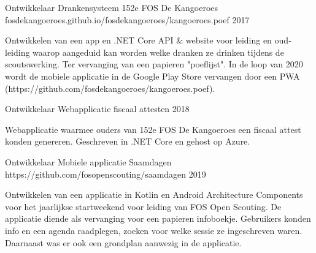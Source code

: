 


\begin{cventries}


\cventry
{Ontwikkelaar} %
{Drankensysteem 152e FOS De Kangoeroes} %
{fosdekangoeroes.github.io/fosdekangoeroes/kangoeroes.poef} %
{2017} %
{ 
\begin{cvitems}
\item {Ontwikkelen van een app en .NET Core API \& website voor leiding en oud-leiding waarop aangeduid kan worden welke dranken ze drinken tijdens de scoutswerking. Ter vervanging van een papieren "poeflijst". In de loop van 2020 wordt de mobiele applicatie in de Google Play Store vervangen door een PWA (https://github.com/fosdekangoeroes/kangoeroes.poef).}
\end{cvitems}
}

\cventry
{Ontwikkelaar} %
{Webapplicatie fiscaal attesten} %
{}
{2018} %
{ 
\begin{cvitems}
\item {Webapplicatie waarmee ouders van 152e FOS De Kangoeroes een fiscaal attest konden genereren. Geschreven in .NET Core en gehost op Azure.}
\end{cvitems}
}

\cventry
{Ontwikkelaar} %
{Mobiele applicatie Saamdagen} %
{https://github.com/fosopenscouting/saamdagen}
{2019} %
{ 
\begin{cvitems}
\item {Ontwikkelen van een applicatie in Kotlin en Android Architecture Components voor het jaarlijkse startweekend voor leiding van FOS Open Scouting. De applicatie diende als vervanging voor een papieren infoboekje. Gebruikers konden info en een agenda raadplegen, zoeken voor welke sessie ze ingeschreven waren. Daarnaast was er ook een grondplan aanwezig in de applicatie.}
\end{cvitems}
}

\end{cventries}